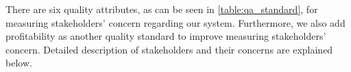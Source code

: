 There are six quality attributes, as can be seen in \autoref{table:qa_standard}, for measuring stakeholders' concern regarding our system. Furthermore, we also add profitability as another quality standard to improve measuring stakeholders' concern. Detailed description of stakeholders and their concerns are explained below.


